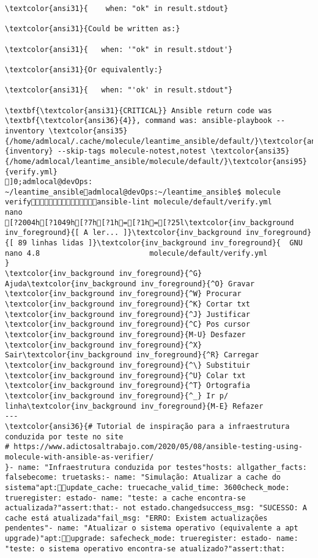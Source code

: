 \documentclass{scrartcl}
\begin{document}
\begin{Verbatim}
\textcolor{ansi31}{    when: "ok" in result.stdout}

\textcolor{ansi31}{Could be written as:}

\textcolor{ansi31}{   when: '"ok" in result.stdout'}

\textcolor{ansi31}{Or equivalently:}

\textcolor{ansi31}{   when: "'ok' in result.stdout"}

\textbf{\textcolor{ansi31}{CRITICAL}} Ansible return code was \textbf{\textcolor{ansi36}{4}}, command was: ansible-playbook --inventory \textcolor{ansi35}{/home/admlocal/.cache/molecule/leantime_ansible/default/}\textcolor{ansi95}{inventory} --skip-tags molecule-notest,notest \textcolor{ansi35}{/home/admlocal/leantime_ansible/molecule/default/}\textcolor{ansi95}{verify.yml}
]0;admlocal@devOps: ~/leantime_ansibleadmlocal@devOps:~/leantime_ansible$ molecule verifyansible-lint molecule/default/verify.yml 
nano
[?2004h[?1049h[?7h[?1h=[?1h=[?25l\textcolor{inv_background inv_foreground}{[ A ler... ]}\textcolor{inv_background inv_foreground}{[ 89 linhas lidas ]}\textcolor{inv_background inv_foreground}{  GNU nano 4.8                         molecule/default/verify.yml                                      }
\textcolor{inv_background inv_foreground}{^G} Ajuda\textcolor{inv_background inv_foreground}{^O} Gravar     \textcolor{inv_background inv_foreground}{^W} Procurar   \textcolor{inv_background inv_foreground}{^K} Cortar txt \textcolor{inv_background inv_foreground}{^J} Justificar \textcolor{inv_background inv_foreground}{^C} Pos cursor \textcolor{inv_background inv_foreground}{M-U} Desfazer
\textcolor{inv_background inv_foreground}{^X} Sair\textcolor{inv_background inv_foreground}{^R} Carregar   \textcolor{inv_background inv_foreground}{^\} Substituir \textcolor{inv_background inv_foreground}{^U} Colar txt  \textcolor{inv_background inv_foreground}{^T} Ortografia \textcolor{inv_background inv_foreground}{^_} Ir p/ linha\textcolor{inv_background inv_foreground}{M-E} Refazer
---
\textcolor{ansi36}{# Tutorial de inspiração para a infraestrutura conduzida por teste no site
# https://www.adictosaltrabajo.com/2020/05/08/ansible-testing-using-molecule-with-ansible-as-verifier/
}- name: "Infraestrutura conduzida por testes"hosts: allgather_facts: falsebecome: truetasks:- name: "Simulação: Atualizar a cache do sistema"apt:update_cache: truecache_valid_time: 3600check_mode: trueregister: estado- name: "teste: a cache encontra-se actualizada?"assert:that:- not estado.changedsuccess_msg: "SUCESSO: A cache está atualizada"fail_msg: "ERRO: Existem actualizações pendentes"- name: "Atualizar o sistema operativo (equivalente a apt upgrade)"apt:upgrade: safecheck_mode: trueregister: estado- name: "teste: o sistema operativo encontra-se atualizado?"assert:that:

\end{Verbatim}
\end{document}
